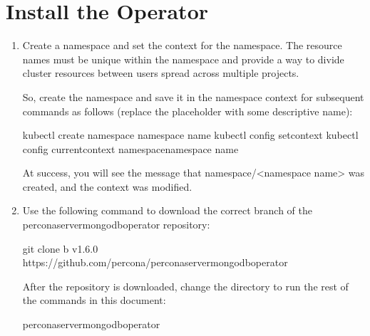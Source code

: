 \documentclass[letterpaper,10pt,english]{sphinxmanual}
\begin{document}
\section{Install the Operator}
\label{\detokenize{eks:install-the-operator}}\begin{enumerate}
%
\item {} 
Create a namespace and set the context for the namespace. The resource names must be unique within the namespace and provide a way to divide cluster resources between users spread across multiple projects.

So, create the namespace and save it in the namespace context for subsequent commands as follows (replace the  placeholder with some descriptive name):

\begin{sphinxVerbatim}[commandchars=\\\{\}]
\PYGZdl{} kubectl create namespace \PYGZlt{}namespace name\PYGZgt{}
\PYGZdl{} kubectl config set\PYGZhy{}context kubectl config current\PYGZhy{}context \PYGZhy{}\PYGZhy{}namespace\PYGZlt{}namespace name\PYGZgt{}
\end{sphinxVerbatim}

At success, you will see the message that namespace/\textless{}namespace name\textgreater{} was created, and the context was modified.

\item {} 
Use the following  command to download the correct branch of the percona\sphinxhyphen{}server\sphinxhyphen{}mongodb\sphinxhyphen{}operator repository:

\begin{sphinxVerbatim}[commandchars=\\\{\}]
git clone \PYGZhy{}b v1.6.0 https://github.com/percona/percona\PYGZhy{}server\PYGZhy{}mongodb\PYGZhy{}operator
\end{sphinxVerbatim}

After the repository is downloaded, change the directory to run the rest of the commands in this document:

\begin{sphinxVerbatim}[commandchars=\\\{\}]
 percona\PYGZhy{}server\PYGZhy{}mongodb\PYGZhy{}operator
\end{sphinxVerbatim}


\end{enumerate}
\end{document}
